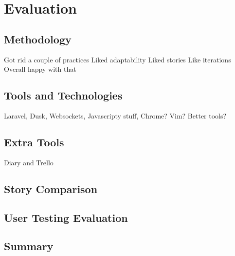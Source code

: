 \chapter{Evaluation}

\section{Methodology}
Got rid a couple of practices
Liked adaptability
Liked stories
Like iterations
Overall happy with that
\section{Tools and Technologies}
Laravel, Dusk, Websockets, Javascripty stuff, Chrome? Vim? Better tools?
\section{Extra Tools}
Diary and Trello
\section{Story Comparison}
\section{User Testing Evaluation}
\section{Summary}